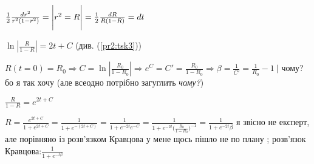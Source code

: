 $\frac{1}{2}\frac{dr^2}{r^2(1-r^2)} = \Bigg{|} r^2 = R \Bigg{|} = \frac{1}{2}\frac{dR}{R(1-R)} = dt$ 

$\ln |\frac{R}{1-R}| = 2t + C$ (див. (\ref{pr2:tsk3}))

$R(t= 0) = R_0 \Longrightarrow C = \ln|\frac{R_0}{1-R_0}| \Longrightarrow e^C =  C' = \frac{R_0}{1-R_0} \Longrightarrow \beta = \frac{1}{C'} = \frac{1}{R_0} - 1 \ \Bigg |$ чому? бо я так хочу (але всеодно потрібно загуглить \textit{чому?})


$\frac{R}{1-R} = e^{2t + C}$

$R = \frac{e^{2t + C}}{1+e^{2t + C}} = \frac{1}{1+e^{-(2t+C)}} = \frac{1}{1+e^{-2t} e^{-C}} = \frac{1}{1+e^{-2t} \big(\frac{R_0}{1-R_0}\big)^{-1}}
= \frac{1}{1+e^{-2t} \beta}$
я звісно не експерт, але порівняно із розв'язком Кравцова у мене щось пішло не по плану ; розв'язок Кравцова:$ \frac{1}{1+e^{-t\beta}}$